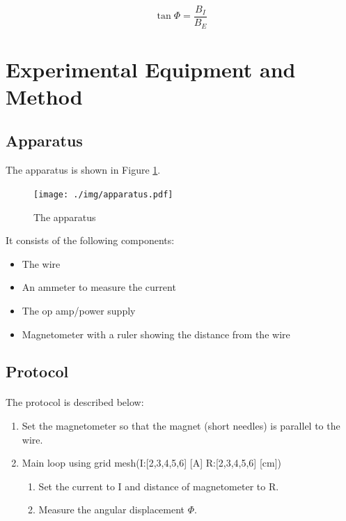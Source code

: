 \documentclass{article}
\begin{document}
\begin{equation}\label{angle}
  \tan{\Phi} = \frac{B_I}{B_E}
\end{equation}

\section{Experimental Equipment and Method}
\subsection{Apparatus}

The apparatus is shown in Figure \ref{fig:apparatus}.

\begin{figure}[H]
  \texttt{[image: ./img/apparatus.pdf]}
  \caption{The apparatus}
  \label{fig:apparatus}
\end{figure}

It consists of the following components:

\begin{itemize}
  \item The wire
  \item An ammeter to measure the current
  \item The op amp/power supply
  \item Magnetometer with a ruler showing the distance from the wire
\end{itemize}

\subsection{Protocol}
\paragraph{}

The protocol is described below:

\begin{enumerate}
  \item Set the magnetometer so that the magnet (short needles) is parallel to the wire.
  \item Main loop using grid mesh(I:[2,3,4,5,6] [A] R:[2,3,4,5,6] [cm])
    \begin{enumerate}
      \item Set the current to I and distance of magnetometer to R.
      \item Measure the angular displacement \(\Phi\).
    \end{enumerate}
\end{enumerate}
\end{document}
